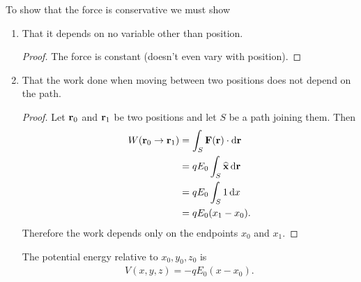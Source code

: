 To show that the force is conservative we must show
\begin{enumerate}
\item That it depends on no variable other than position.
  \begin{proof}
    The force is constant (doesn't even vary with position).
  \end{proof}

\item That the work done when moving between two positions does not depend on the path.
  \begin{proof}
    Let $\mathbf{r}_0$ and $\mathbf{r}_1$ be two positions and let $S$ be a path joining them. Then
    \begin{align*}
      W(\r_0 \to \r_1)
      &= \int_S \F(\r) \cdot \d \r \\
      &= qE_0\int_S \xhat \d\r \\
      &= qE_0\int_S 1 \dx \\
      &= qE_0(x_1 - x_0).
    \end{align*}
    Therefore the work depends only on the endpoints $x_0$ and $x_1$.
  \end{proof}
  The potential energy relative to $x_0, y_0, z_0$ is
  \begin{align*}
    V(x, y, z) = -qE_0(x - x_0).
  \end{align*}
\end{enumerate}



